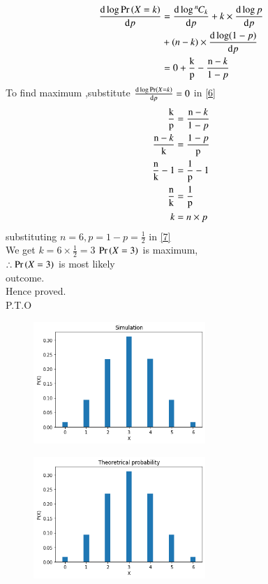 \documentclass[journal,12pt,twocolumn]{IEEEtran}
\newcommand*{\permcomb}[4][0mu]{{{}^{#3}\mkern#1#2_{#4}}}
\newcommand*{\comb}[1][-1mu]{\permcomb[#1]{C}}
\begin{document}
\begin{align}
\frac{\mathrm{d} \log \pr{X=k} }{\mathrm{d} p}&=\frac{\mathrm{d} \log  \comb{n}{k} }{\mathrm{d}p}+k\times  \frac{\mathrm{d}\log p}{\mathrm{d} p} \\
     &+(n-k) \times \frac{\mathrm{d}\log (1-p)}{\mathrm{d} p} \notag \\
     &=0+\frac{\text k}{\text p}-\frac{\text n-k}{\text 1-p} \label{6}
\end{align}
To find maximum ,substitute $\frac{\mathrm{d} \log  \Pr\left(X=k\right) }{\mathrm{d} p}=0$ in \eqref{6}
\begin{align}
\frac{\text k}{\text p}&=\frac{\text n-k}{\text 1-p}  \\
\frac{\text n-k}{\text k}&=\frac{\text 1-p}{\text p}  \\
\frac{\text n}{\text k}-1&=\frac{\text 1}{\text p}-1  \\
\frac{\text n}{\text k}&=\frac{\text 1}{\text p}  \\
k&=n\times p \label{7}
\end{align}
substituting $n=6,p=1-p=\frac{1}{2}$ in \eqref{7}\\
We get $k=6\times \frac{1}{2}=3$
$\Pr\left(X=3\right)$ is maximum,\\
$\therefore\Pr\left(X=3\right)$ is most likely \\
outcome.\\
Hence proved.\\
P.T.O\\

\begin{figure}
\begin{center}
\includegraphics[width=0.58\textwidth]{assignment1.png}
\end{center}
\end{figure}
\begin{figure}
\begin{center}
\includegraphics[width=0.58\textwidth]{assignment-1.png}
\end{center}
\end{figure}
\end{document}
